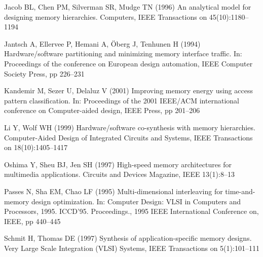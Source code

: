 \documentclass[smallextended]{svjour3}
\begin{document}
\begin{thebibliography}{40}
Jacob BL, Chen PM, Silverman SR, Mudge TN (1996) An analytical model for
  designing memory hierarchies. Computers, IEEE Transactions on
  45(10):1180--1194

Jantsch A, Ellervee P, Hemani A, {\"O}berg J, Tenhunen H (1994)
  Hardware/software partitioning and minimizing memory interface traffic. In:
  Proceedings of the conference on European design automation, IEEE Computer
  Society Press, pp 226--231

Kandemir M, Sezer U, Delaluz V (2001) Improving memory energy using access
  pattern classification. In: Proceedings of the 2001 IEEE/ACM international
  conference on Computer-aided design, IEEE Press, pp 201--206

Li Y, Wolf WH (1999) Hardware/software co-synthesis with memory hierarchies.
  Computer-Aided Design of Integrated Circuits and Systems, IEEE Transactions
  on 18(10):1405--1417

Oshima Y, Sheu BJ, Jen SH (1997) High-speed memory architectures for multimedia
  applications. Circuits and Devices Magazine, IEEE 13(1):8--13

Passes N, Sha EM, Chao LF (1995) Multi-dimensional interleaving for
  time-and-memory design optimization. In: Computer Design: VLSI in Computers
  and Processors, 1995. ICCD'95. Proceedings., 1995 IEEE International
  Conference on, IEEE, pp 440--445

Schmit H, Thomas DE (1997) Synthesis of application-specific memory designs.
  Very Large Scale Integration (VLSI) Systems, IEEE Transactions on
  5(1):101--111
 

\end{thebibliography}
\end{document}
